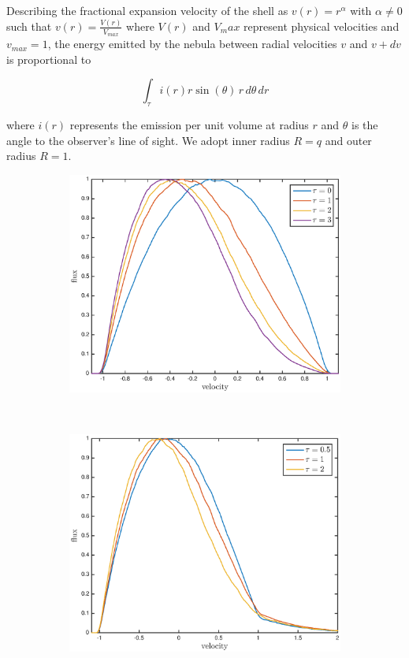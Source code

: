 Describing the fractional expansion velocity of the shell as $v(r)=r^\alpha$ with 
$\alpha \neq 0$ such that $v(r)=\frac{V(r)}{V_{max}}$ where $V(r)$ and $V_max$ represent physical velocities and $v_{max}=1$, the energy emitted by 
the nebula between radial velocities $v$ and $v+dv$ is proportional to

\begin{equation}
\int _\tau i(r) r \sin (\theta) \, r \, d\theta \, dr
\end{equation}

\noindent where $i(r)$ represents the emission per unit volume at radius 
$r$ and $\theta$ is the angle to the observer's line of sight.  We adopt inner radius $R=q$ and outer radius $R=1$.

\begin{figure}
\begin{subfigure}{\textwidth}
\centering
\includegraphics[trim =37 10 45 15,clip=true,scale=0.75]{chapters/chapter4/images/params/opt_thick_w0}
\end{subfigure} \\[1ex]
\begin{subfigure}{\textwidth} 
\centering
\includegraphics[trim =37 10 45 15,clip=true,scale=0.75]{chapters/chapter4/images/params/opt_thick_w0_6}

\end{subfigure}
\end{figure}
